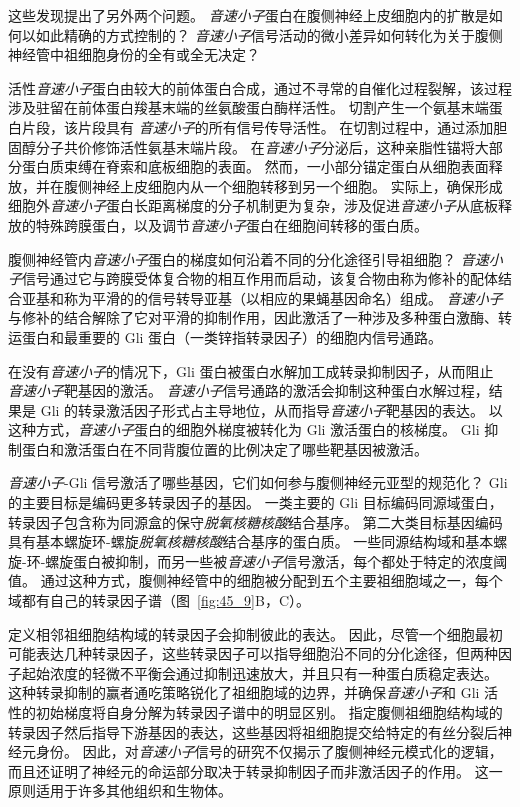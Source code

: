 这些发现提出了另外两个问题。
\textit{音速小子}蛋白在腹侧神经上皮细胞内的扩散是如何以如此精确的方式控制的？
\textit{音速小子}信号活动的微小差异如何转化为关于腹侧神经管中祖细胞身份的全有或全无决定？


活性\textit{音速小子}蛋白由较大的前体蛋白合成，通过不寻常的自催化过程裂解，该过程涉及驻留在前体蛋白羧基末端的丝氨酸蛋白酶样活性。
切割产生一个氨基末端蛋白片段，该片段具有 \textit{音速小子}的所有信号传导活性。
在切割过程中，通过添加胆固醇分子共价修饰活性氨基末端片段。
在\textit{音速小子}分泌后，这种亲脂性锚将大部分蛋白质束缚在脊索和底板细胞的表面。
然而，一小部分锚定蛋白从细胞表面释放，并在腹侧神经上皮细胞内从一个细胞转移到另一个细胞。
实际上，确保形成细胞外\textit{音速小子}蛋白长距离梯度的分子机制更为复杂，涉及促进\textit{音速小子}从底板释放的特殊跨膜蛋白，以及调节\textit{音速小子}蛋白在细胞间转移的蛋白质。


腹侧神经管内\textit{音速小子}蛋白的梯度如何沿着不同的分化途径引导祖细胞？
\textit{音速小子}信号通过它与跨膜受体复合物的相互作用而启动，该复合物由称为修补的配体结合亚基和称为平滑的的信号转导亚基（以相应的果蝇基因命名）组成。
\textit{音速小子}与修补的结合解除了它对平滑的抑制作用，因此激活了一种涉及多种蛋白激酶、转运蛋白和最重要的 Gli 蛋白（一类锌指转录因子）的细胞内信号通路。


在没有\textit{音速小子}的情况下，Gli 蛋白被蛋白水解加工成转录抑制因子，从而阻止 \textit{音速小子}靶基因的激活。
\textit{音速小子}信号通路的激活会抑制这种蛋白水解过程，结果是 Gli 的转录激活因子形式占主导地位，从而指导\textit{音速小子}靶基因的表达。
以这种方式，\textit{音速小子}蛋白的细胞外梯度被转化为 Gli 激活蛋白的核梯度。
Gli 抑制蛋白和激活蛋白在不同背腹位置的比例决定了哪些靶基因被激活。


\textit{音速小子}-Gli 信号激活了哪些基因，它们如何参与腹侧神经元亚型的规范化？
Gli 的主要目标是编码更多转录因子的基因。
一类主要的 Gli 目标编码同源域蛋白，转录因子包含称为同源盒的保守\textit{脱氧核糖核酸}结合基序。
第二大类目标基因编码具有基本螺旋环-螺旋\textit{脱氧核糖核酸}结合基序的蛋白质。
一些同源结构域和基本螺旋-环-螺旋蛋白被抑制，而另一些被\textit{音速小子}信号激活，每个都处于特定的浓度阈值。
通过这种方式，腹侧神经管中的细胞被分配到五个主要祖细胞域之一，每个域都有自己的转录因子谱（图~\ref{fig:45_9}B，C）。


定义相邻祖细胞结构域的转录因子会抑制彼此的表达。
因此，尽管一个细胞最初可能表达几种转录因子，这些转录因子可以指导细胞沿不同的分化途径，但两种因子起始浓度的轻微不平衡会通过抑制迅速放大，并且只有一种蛋白质稳定表达。
这种转录抑制的赢者通吃策略锐化了祖细胞域的边界，并确保\textit{音速小子}和 Gli 活性的初始梯度将自身分解为转录因子谱中的明显区别。
指定腹侧祖细胞结构域的转录因子然后指导下游基因的表达，这些基因将祖细胞提交给特定的有丝分裂后神经元身份。
因此，对\textit{音速小子}信号的研究不仅揭示了腹侧神经元模式化的逻辑，而且还证明了神经元的命运部分取决于转录抑制因子而非激活因子的作用。
这一原则适用于许多其他组织和生物体。


